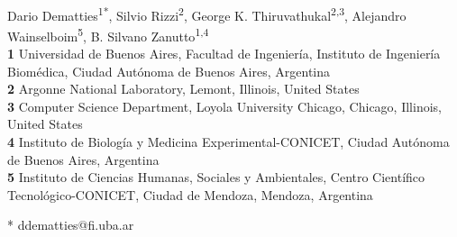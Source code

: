 \documentclass[10pt,letterpaper]{article}
\date{}
\begin{document}
\vspace*{0.2in}

\begin{flushleft}
{\Large
\textbf{} %
}
\newline
\\
Dario Dematties\textsuperscript{1*},
Silvio Rizzi\textsuperscript{2},
George K. Thiruvathukal\textsuperscript{2,3},
Alejandro Wainselboim\textsuperscript{5},
B. Silvano Zanutto\textsuperscript{1,4} %
\\
\bigskip
\textbf{1} Universidad de Buenos Aires, Facultad de Ingenier\'ia, Instituto de Ingenier\'ia Biom\'edica, Ciudad Aut\'onoma de Buenos Aires, Argentina
\\
\textbf{2} Argonne National Laboratory, Lemont, Illinois, United States
\\
\textbf{3} Computer Science Department, Loyola University Chicago, Chicago, Illinois, United States
\\
\textbf{4} Instituto de Biolog\'ia y Medicina Experimental-CONICET, Ciudad Aut\'onoma de Buenos Aires, Argentina
\\
\textbf{5} Instituto de Ciencias Humanas, Sociales y Ambientales, Centro Cient\'ifico Tecnol\'ogico-CONICET, Ciudad de Mendoza, Mendoza, Argentina
\\
\bigskip

% 
%





* ddematties@fi.uba.ar
 

\end{flushleft}
\end{document}
